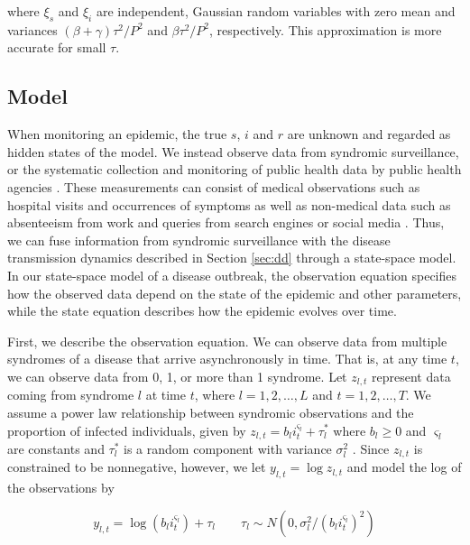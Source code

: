 \documentclass{elsarticle}
\begin{document}
\noindent where $\xi_s$ and $\xi_i$ are independent, Gaussian random variables with zero mean and variances $(\beta + \gamma)\tau^2/P^2$ and $\beta\tau^2/P^2$, respectively.  This approximation is more accurate for small $\tau$.

\subsection{Model}

When monitoring an epidemic, the true $s$, $i$ and $r$ are unknown and regarded as hidden states of the model.  We instead observe data from syndromic surveillance, or the systematic collection and monitoring of public health data by public health agencies \citep{wagner2006biosurveillance, wilson2006synsurveillance}.  These measurements can consist of medical observations such as hospital visits and occurrences of symptoms as well as non-medical data such as absenteeism from work and queries from search engines or social media \citep{chew2010twitter, schuster2010searchquery, signorini2011twitter, Gins:Mohe:Pate:Bram:Smol:Bril:dete:2009}.  Thus, we can fuse information from syndromic surveillance with the disease transmission dynamics described in Section \ref{sec:dd} through a state-space model.  In our state-space model of a disease outbreak, the observation equation specifies how the observed data depend on the state of the epidemic and other parameters, while the state equation describes how the epidemic evolves over time.

First, we describe the observation equation.  We can observe data from multiple syndromes of a disease that arrive asynchronously in time.  That is, at any time $t$, we can observe data from 0, 1, or more than 1 syndrome.  Let $z_{l,t}$ represent data coming from syndrome $l$ at time $t$, where $l = 1,2,\ldots,L$ and $t = 1,2,\ldots,T$.  We assume a power law relationship between syndromic observations and the proportion of infected individuals, given by $z_{l,t} = b_li_t^{\varsigma_l} + \tau^*_l$ where $b_l \ge 0$ and $\varsigma_l$ are constants and $\tau^*_l$ is a random component with variance $\sigma_l^2$ \citep{Gins:Mohe:Pate:Bram:Smol:Bril:dete:2009}.  Since $z_{l,t}$ is constrained to be nonnegative, however, we let $y_{l,t} = \log z_{l,t}$ and model the log of the observations by

\begin{equation}
y_{l,t} = \log \left(b_li_t^{\varsigma_l}\right) + \tau_l \qquad \tau_l \sim N\left(0,\sigma_l^2 / (b_li_t^{\varsigma_l})^2\right) \label{eqn:obs}
\end{equation}
\end{document}

